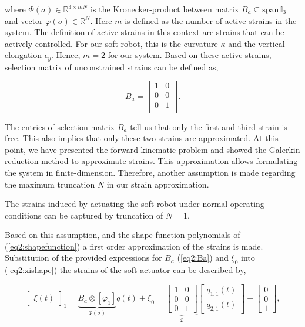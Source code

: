 where $\Phi(\sigma) \in \mathbb{R}^{3 \times mN}$ is the Kronecker-product between matrix $B_a \subseteq \text{span} \hspace{2pt} \mathbb{I}_3$ and vector $\varphi(\sigma) \in \mathbb{R}^N$. Here $m$ is defined as the number of active strains in the system. The definition of active strains in this context are strains that can be actively controlled. For our soft robot, this is the curvature $\kappa$ and the vertical elongation $\epsilon_y$. Hence, $m=2$ for our system. Based on these active strains, selection matrix of unconstrained strains can be defined as,

\begin{equation}
    B_a = \begin{bmatrix}
    1 & 0 \\
    0 & 0  \\
    0 & 1  \\
    \end{bmatrix}.
    \label{eq2:Ba}
\end{equation}

The entries of selection matrix $B_a$ tell us that only the first and third strain is free. This also implies that only these two strains are approximated. At this point, we have presented the forward kinematic problem and showed the Galerkin reduction method to approximate strains. This approximation allows formulating the system in finite-dimension. Therefore, another assumption is made regarding the maximum truncation $N$ in our strain approximation.

\begin{theorem}
The strains induced by actuating the soft robot under normal operating conditions can be captured by truncation of $N = 1$. 
\end{theorem}

Based on this assumption, and the shape function polynomials of (\ref{eq2:shapefunction}) a first order approximation of the strains is made. Substitution of the provided expressions for $B_a$ (\ref{eq2:Ba}) and $\xi_0$ into (\ref{eq2:xishape}) the strains of the soft actuator can be described by,


\begin{equation}
    \begin{bmatrix}\xi(t)\end{bmatrix}_1 =\underbrace{B_a \otimes [\varphi_1]}_{\Phi(\sigma)} q(t) + \xi_0  =  \underbrace{\begin{bmatrix}
    1 & 0  \\
    0 & 0  \\
    0 & 1
    \end{bmatrix}}_{\Phi} \begin{bmatrix} q_{1,1}(t) \\  q_{2,1}(t) \end{bmatrix} +  \begin{bmatrix} 0 \\ 0 \\ 1   \end{bmatrix},
\label{eq2:xiapprox}
\end{equation}

